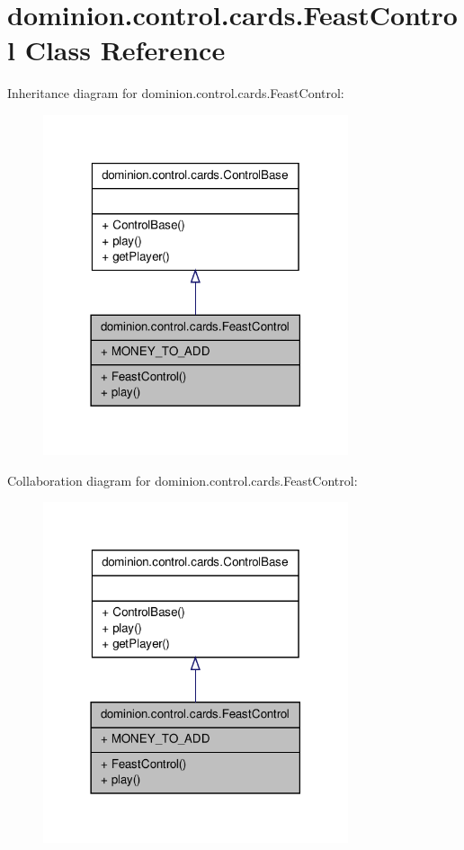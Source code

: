 \hypertarget{classdominion_1_1control_1_1cards_1_1FeastControl}{\section{dominion.\-control.\-cards.\-Feast\-Control \-Class \-Reference}
\label{classdominion_1_1control_1_1cards_1_1FeastControl}
}


\-Inheritance diagram for dominion.\-control.\-cards.\-Feast\-Control\-:
\nopagebreak
\begin{figure}[H]
\begin{center}
\leavevmode
\includegraphics[width=254pt]{classdominion_1_1control_1_1cards_1_1FeastControl__inherit__graph}
\end{center}
\end{figure}


\-Collaboration diagram for dominion.\-control.\-cards.\-Feast\-Control\-:
\nopagebreak
\begin{figure}[H]
\begin{center}
\leavevmode
\includegraphics[width=254pt]{classdominion_1_1control_1_1cards_1_1FeastControl__coll__graph}
\end{center}
\end{figure}
